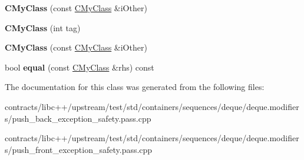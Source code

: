 \begin{DoxyCompactItemize}
\item 
\mbox{\label{class_c_my_class_afb05c852b59c0d651c6f5192e63bee49}} 
{\bfseries C\+My\+Class} (const \mbox{\hyperlink{class_c_my_class}{C\+My\+Class}} \&i\+Other)
\item 
\mbox{\label{class_c_my_class_ab1912cccaf57a26c6835075192e1bb18}} 
{\bfseries C\+My\+Class} (int tag)
\item 
\mbox{\label{class_c_my_class_afb05c852b59c0d651c6f5192e63bee49}} 
{\bfseries C\+My\+Class} (const \mbox{\hyperlink{class_c_my_class}{C\+My\+Class}} \&i\+Other)
\item 
\mbox{\label{class_c_my_class_ad7951d354b56c6cd248a44661578d50d}} 
bool {\bfseries equal} (const \mbox{\hyperlink{class_c_my_class}{C\+My\+Class}} \&rhs) const
\end{DoxyCompactItemize}


The documentation for this class was generated from the following files\+:\begin{DoxyCompactItemize}
\item 
contracts/libc++/upstream/test/std/containers/sequences/deque/deque.\+modifiers/push\+\_\+back\+\_\+exception\+\_\+safety.\+pass.\+cpp\item 
contracts/libc++/upstream/test/std/containers/sequences/deque/deque.\+modifiers/push\+\_\+front\+\_\+exception\+\_\+safety.\+pass.\+cpp\end{DoxyCompactItemize}
